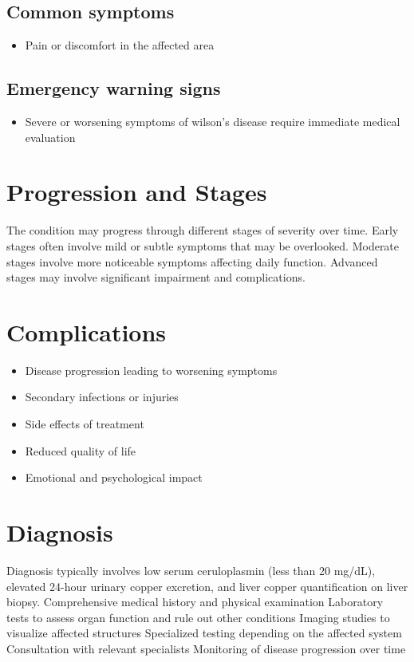 \subsection{Common symptoms}
\begin{itemize}[noitemsep]
  \item Pain or discomfort in the affected area
  \end{itemize}

\subsection{Emergency warning signs}
\begin{itemize}[noitemsep]
  \item Severe or worsening symptoms of wilson's disease require immediate medical evaluation
\end{itemize}
\section{Progression and Stages}
The condition may progress through different stages of severity over time. Early stages often involve mild or subtle symptoms that may be overlooked. Moderate stages involve more noticeable symptoms affecting daily function. Advanced stages may involve significant impairment and complications.
\section{Complications}
\begin{itemize}[noitemsep]
  \item Disease progression leading to worsening symptoms
  \item Secondary infections or injuries
  \item Side effects of treatment
  \item Reduced quality of life
  \item Emotional and psychological impact
\end{itemize}
\section{Diagnosis}
Diagnosis typically involves low serum ceruloplasmin (less than 20 mg/dL), elevated 24-hour urinary copper excretion, and liver copper quantification on liver biopsy. Comprehensive medical history and physical examination Laboratory tests to assess organ function and rule out other conditions Imaging studies to visualize affected structures Specialized testing depending on the affected system Consultation with relevant specialists Monitoring of disease progression over time

